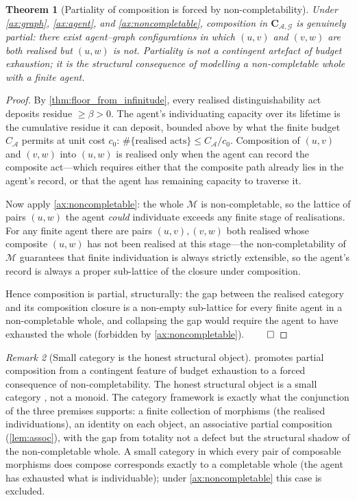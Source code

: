 \documentclass[11pt,a4paper]{article}
\theoremstyle{thmstyle}
\newtheorem{theorem}{Theorem}[section]
\theoremstyle{definition}
\theoremstyle{remark}
\newtheorem{remark}[theorem]{Remark}
\newcommand{\Graph}{\mathcal{G}}
\newcommand{\Agent}{\mathcal{A}}
\newcommand{\floor}{\beta}
\begin{document}
\begin{theorem}[Partiality of composition is forced by
non-completability]
\label{thm:partiality_forced}
Under \cref{ax:graph}, \cref{ax:agent}, and
\cref{ax:noncompletable}, composition in
$\mathbf{C}_{\Agent,\Graph}$ is genuinely partial: there exist
agent--graph configurations in which $(u, v)$ and $(v, w)$ are both
realised but $(u, w)$ is not. Partiality is not a contingent
artefact of budget exhaustion; it is the structural consequence of
modelling a non-completable whole with a finite agent.
\end{theorem}

\begin{proof}
By \cref{thm:floor_from_infinitude}, every realised
distinguishability act deposits residue $\geq \floor > 0$. The
agent's individuating capacity over its lifetime is the cumulative
residue it can deposit, bounded above by what the finite budget
$C_\Agent$ permits at unit cost $c_0$:
$\#\{\text{realised acts}\} \leq C_\Agent / c_0$.
Composition of $(u, v)$ and $(v, w)$ into $(u, w)$ is realised only
when the agent can record the composite act---which requires either
that the composite path already lies in the agent's record, or that
the agent has remaining capacity to traverse it.

Now apply \cref{ax:noncompletable}: the whole $\mathcal M$ is
non-completable, so the lattice of pairs $(u, w)$ the agent
\emph{could} individuate exceeds any finite stage of realisations.
For any finite agent there are pairs $(u, v), (v, w)$ both realised
whose composite $(u, w)$ has not been realised at this stage---the
non-completability of $\mathcal M$ guarantees that finite
individuation is always strictly extensible, so the agent's record
is always a proper sub-lattice of the closure under composition.

Hence composition is partial, structurally: the gap between the
realised category and its composition closure is a non-empty
sub-lattice for every finite agent in a non-completable whole, and
collapsing the gap would require the agent to have exhausted the
whole (forbidden by \cref{ax:noncompletable}). $\qed$
\end{proof}

\begin{remark}[Small category is the honest structural object]
\label{rem:why_category}
 promotes partial composition from a
contingent feature of budget exhaustion to a forced consequence of
non-completability. The honest structural object is a small
category \citep{maclane1998}, not a monoid. The category framework
is exactly what the conjunction of the three premises supports: a
finite collection of morphisms (the realised individuations), an
identity on each object, an associative partial composition
(\cref{lem:assoc}), with the gap from totality not a defect but the
structural shadow of the non-completable whole. A small category in
which every pair of composable morphisms does compose corresponds
exactly to a completable whole (the agent has exhausted what is
individuable); under \cref{ax:noncompletable} this case is
excluded.
\end{remark}
\end{document}
